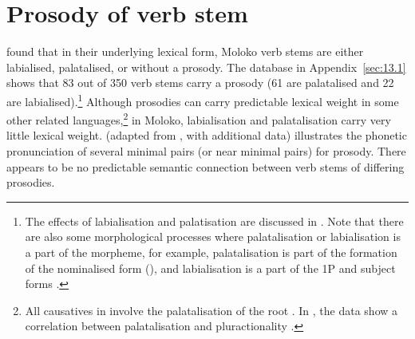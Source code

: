 \section{Prosody of verb stem}\label{sec:6.6}
\hypertarget{RefHeading1212001525720847}{}
\largerpage[2] \citet{Bow1997c} found that in their underlying lexical form, Moloko verb stems are either labialised, palatalised, or without a prosody.  The database in Appendix~\ref{sec:13.1} shows that 83 out of 350 verb stems carry a prosody (61 are palatalised and 22 are labialised).\footnote{The effects of labialisation and palatisation are discussed in . Note that there are also some morphological processes where palatalisation or labialisation is a part of the morpheme, for example, palatalisation is part of the formation of the nominalised form (), and labialisation is a part of the 1P and {\twoP} subject forms .} Although prosodies can carry predictable lexical weight in some other related languages,\footnote{All causatives in  involve the palatalisation of the root \citep{Smith2002}. In , the data show a correlation between palatalisation and pluractionality \citep{Gravina2001}.} in Moloko, labialisation and palatalisation carry very little lexical weight.  (adapted from \citealt{Bow1997c}, with additional data) illustrates the phonetic pronunciation of several minimal pairs (or near minimal pairs) for prosody. There appears to be no predictable semantic connection between verb stems of differing prosodies. 


